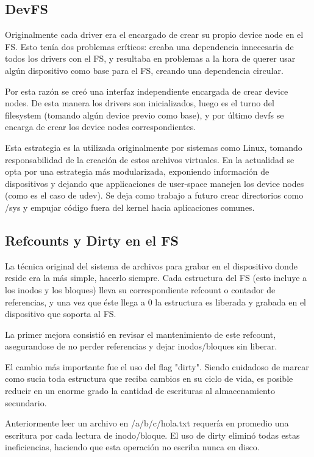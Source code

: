 \subsection{DevFS}

Originalmente cada driver era el encargado de crear su propio device node en el
FS. Esto tenía dos problemas críticos: creaba una dependencia innecesaria de todos
los drivers con el FS, y resultaba en problemas a la hora de querer usar algún
dispositivo como base para el FS, creando una dependencia circular.

Por esta razón se creó una interfaz independiente encargada de crear device
nodes. De esta manera los drivers son inicializados, luego es el turno del
filesystem (tomando algún device previo como base), y por último devfs se
encarga de crear los device nodes correspondientes.

Esta estrategia es la utilizada originalmente por sistemas como Linux, tomando
responsabilidad de la creación de estos archivos virtuales. En la actualidad se
opta por una estrategia más modularizada, exponiendo información de dispositivos
y dejando que applicaciones de user-space manejen los device nodes (como es el
caso de udev). Se deja como trabajo a futuro crear directorios como /sys y
empujar código fuera del kernel hacia aplicaciones comunes.

\subsection{Refcounts y Dirty en el FS}

La técnica original del sistema de archivos para grabar en el dispositivo donde
reside era la más simple, hacerlo siempre. Cada estructura del FS (esto incluye
a los inodos y los bloques) lleva su correspondiente refcount o contador de
referencias, y una vez que éste llega a 0 la estructura es liberada y grabada en
el dispositivo que soporta al FS.

La primer mejora consistió en revisar el mantenimiento de este refcount,
asegurandose de no perder referencias y dejar inodos/bloques sin liberar.

El cambio más importante fue el uso del flag "dirty". Siendo cuidadoso de marcar como
sucia toda estructura que reciba cambios en su ciclo de vida, es posible reducir
en un enorme grado la cantidad de escrituras al almacenamiento secundario.

Anteriormente leer un archivo en /a/b/c/hola.txt requería en promedio
una escritura por cada lectura de inodo/bloque. El uso de dirty eliminó todas
estas ineficiencias, haciendo que esta operación no escriba nunca en disco.

